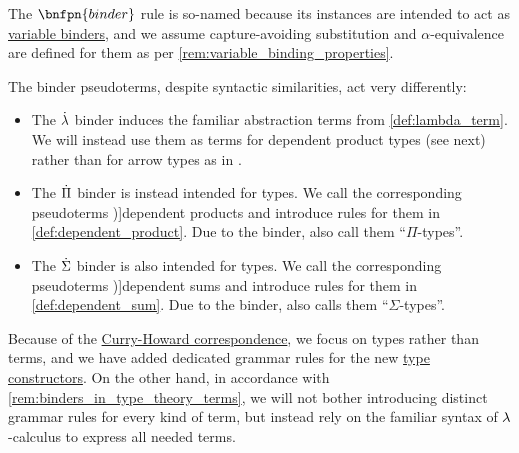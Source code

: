 \begin{definition}
  The \( \bnfpn{binder} \) rule is so-named because its instances are intended to act as \hyperref[con:variable_binding]{variable binders}, and we assume capture-avoiding substitution and \( \alpha \)-equivalence are defined for them as per \cref{rem:variable_binding_properties}.

  The binder pseudoterms, despite syntactic similarities, act very differently:
  \begin{itemize}
    \item The \( \mathord{\dot{{\mathrm \lambda}}} \) binder induces the familiar abstraction terms from \cref{def:lambda_term}. We will instead use them as terms for dependent product types (see next) rather than for arrow types as in .

    \item The \( \dot{\Pi} \) binder is instead intended for types. We call the corresponding pseudoterms \term[en=dependent product (\cite[\S 1.4]{UnivalentFoundationsProgram2013HoTT})]{dependent products} and introduce rules for them in \cref{def:dependent_product}. Due to the binder,  also call them \enquote{\( \Pi \)-types}.

    \item The \( \dot{\Sigma} \) binder is also intended for types. We call the corresponding pseudoterms \term[en=dependent sum (\cite[\S 8.3.4]{Mimram2020ProgramEqualsProof})]{dependent sums} and introduce rules for them in \cref{def:dependent_sum}. Due to the binder,  also calls them \enquote{\( \Sigma \)-types}.
  \end{itemize}
\end{definition}
\begin{comments}
  \item Because of the \hyperref[con:curry_howard_correspondence]{Curry-Howard correspondence}, we focus on types rather than terms, and we have added dedicated grammar rules for the new \hyperref[con:type_constructor]{type constructors}. On the other hand, in accordance with \cref{rem:binders_in_type_theory_terms}, we will not bother introducing distinct grammar rules for every kind of term, but instead rely on the familiar syntax of \( {\mathrm \lambda} \)-calculus to express all needed terms.
\end{comments}

